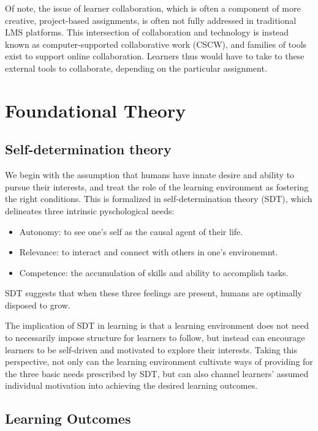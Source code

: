 \documentclass[12pt,twoside,vi]{mitthesis}
\begin{document}
Of note, the issue of learner collaboration, which is often a component of more creative, project-based assignments, is often not fully addressed in traditional LMS platforms. This intersection of collaboration and technology is instead known as computer-supported collaborative work (CSCW), and families of tools exist to support online collaboration. Learners thus would have to take to these external tools to collaborate, depending on the particular assignment.

\section{Foundational Theory}

\subsection{Self-determination theory}

We begin with the assumption that humans have innate desire and ability to pursue their interests, and treat the role of the learning environment as fostering the right conditions. This is formalized in self-determination theory (SDT), which delineates three intrinsic pyschological needs:
\begin{itemize}
\item Autonomy: to see one's self as the causal agent of their life.
\item Relevance: to interact and connect with others in one's environemnt.
\item Competence: the accumulation of skills and ability to accomplish tasks.
\end{itemize}
SDT suggests that when these three feelings are present, humans are optimally disposed to grow.~\cite{ryan2000self}\cite{selfdetermination2}

The implication of SDT in learning is that a learning environment does not need to necessarily impose structure for learners to follow, but instead can encourage learners to be self-driven and motivated to explore their interests. Taking this perspective, not only can the learning environment cultivate ways of providing for the three basic needs prescribed by SDT, but can also channel learners' assumed individual motivation into achieving the desired learning outcomes.~\cite{selfdetermination}\cite{niemiec2009autonomy}

\subsection{Learning Outcomes}
\end{document}
